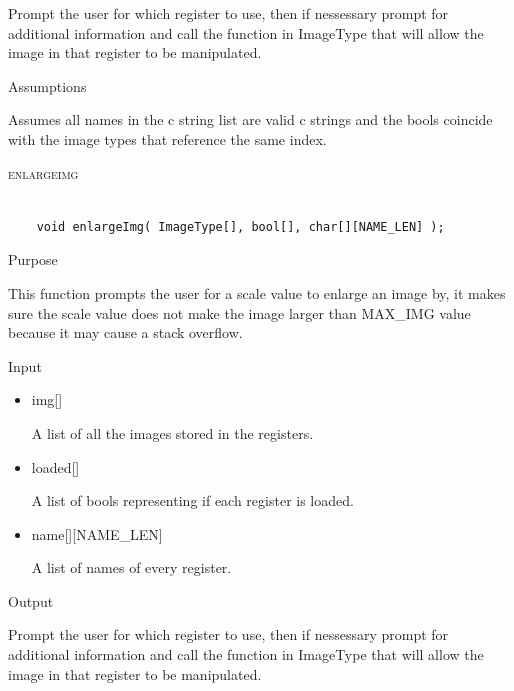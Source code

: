 \documentclass[pdftex, 11pt]{article}
\begin{document}
\begin{description}
\begin{description}
				Prompt the user for which register to use, then if nessessary
				prompt for additional information and call the function
				in ImageType that will allow the image in that register to
				be manipulated.

			\item{Assumptions}

				Assumes all names in the c string list are valid c
				strings and the bools coincide with the image types that
				reference the same index.

		\end{description}



	\item{\textsc{enlargeimg}}

		\begin{lstlisting}

	void enlargeImg( ImageType[], bool[], char[][NAME_LEN] );
		\end{lstlisting}

		\begin{description}
			\item{Purpose}

				This function prompts the user for a scale value to enlarge an image by, it
				makes sure the scale value does not make the image larger than MAX\_IMG value
				because it may cause a stack overflow.

			\item{Input}

				\begin{itemize}

					\item{img[]}

						A list of all the images stored in the registers.

					\item{loaded[]}

						A list of bools representing if each register is loaded.

					\item{name[][NAME\_LEN]}

						A list of names of every register.

				\end{itemize}

			\item{Output}

				Prompt the user for which register to use, then if nessessary
				prompt for additional information and call the function
				in ImageType that will allow the image in that register to
				be manipulated.


\end{description}
\end{description}
\end{document}
